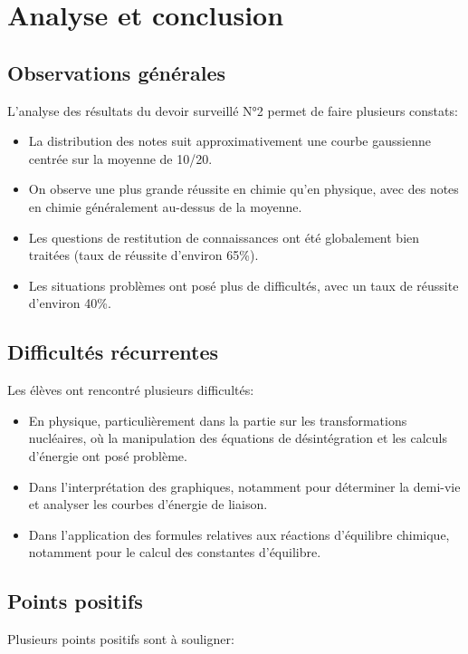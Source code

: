 \documentclass[12pt]{article}
\begin{document}
\section{Analyse et conclusion}

\subsection{Observations générales}
L'analyse des résultats du devoir surveillé N°2 permet de faire plusieurs constats:

\begin{itemize}
    \item La distribution des notes suit approximativement une courbe gaussienne centrée sur la moyenne de 10/20.
    \item On observe une plus grande réussite en chimie qu'en physique, avec des notes en chimie généralement au-dessus de la moyenne.
    \item Les questions de restitution de connaissances ont été globalement bien traitées (taux de réussite d'environ 65\%).
    \item Les situations problèmes ont posé plus de difficultés, avec un taux de réussite d'environ 40\%.
\end{itemize}

\subsection{Difficultés récurrentes}
Les élèves ont rencontré plusieurs difficultés:

\begin{itemize}
    \item En physique, particulièrement dans la partie sur les transformations nucléaires, où la manipulation des équations de désintégration et les calculs d'énergie ont posé problème.
    \item Dans l'interprétation des graphiques, notamment pour déterminer la demi-vie et analyser les courbes d'énergie de liaison.
    \item Dans l'application des formules relatives aux réactions d'équilibre chimique, notamment pour le calcul des constantes d'équilibre.
\end{itemize}

\subsection{Points positifs}
Plusieurs points positifs sont à souligner:
\end{document}
